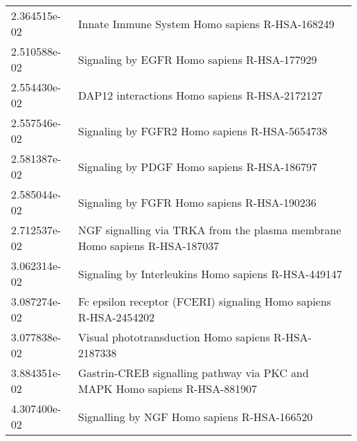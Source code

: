 \begin{longtable}{p{2.4cm}p{14.5cm}}
             2.364515e-02 &                                                Innate Immune System Homo sapiens R-HSA-168249 \\
             2.510588e-02 &                                                   Signaling by EGFR Homo sapiens R-HSA-177929 \\
             2.554430e-02 &                                                 DAP12 interactions Homo sapiens R-HSA-2172127 \\
             2.557546e-02 &                                                 Signaling by FGFR2 Homo sapiens R-HSA-5654738 \\
             2.581387e-02 &                                                   Signaling by PDGF Homo sapiens R-HSA-186797 \\
             2.585044e-02 &                                                   Signaling by FGFR Homo sapiens R-HSA-190236 \\
             2.712537e-02 &                    NGF signalling via TRKA from the plasma membrane Homo sapiens R-HSA-187037 \\
             3.062314e-02 &                                           Signaling by Interleukins Homo sapiens R-HSA-449147 \\
             3.087274e-02 &                              Fc epsilon receptor (FCERI) signaling Homo sapiens R-HSA-2454202 \\
             3.077838e-02 &                                           Visual phototransduction Homo sapiens R-HSA-2187338 \\
             3.884351e-02 &                    Gastrin-CREB signalling pathway via PKC and MAPK Homo sapiens R-HSA-881907 \\
             4.307400e-02 &                                                   Signalling by NGF Homo sapiens R-HSA-166520 \\
\end{longtable}



